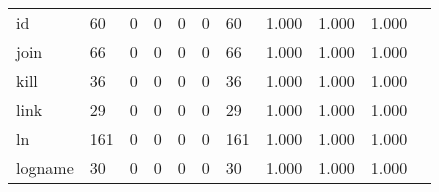 \begin{longtable}{lp{1.2cm}p{1.2cm}p{1.2cm}p{1.2cm}p{1.2cm}p{1.2cm}p{1.2cm}p{1.2cm}p{1.2cm}p{1.2cm}}
id        &                                    60 &                                                  0 &                                                  0 &                                                  0 &                                                  0 &                                                 60 &                                              1.000 &                                              1.000 &                                              1.000 \\
join      &                                    66 &                                                  0 &                                                  0 &                                                  0 &                                                  0 &                                                 66 &                                              1.000 &                                              1.000 &                                              1.000 \\
kill      &                                    36 &                                                  0 &                                                  0 &                                                  0 &                                                  0 &                                                 36 &                                              1.000 &                                              1.000 &                                              1.000 \\
link      &                                    29 &                                                  0 &                                                  0 &                                                  0 &                                                  0 &                                                 29 &                                              1.000 &                                              1.000 &                                              1.000 \\
ln        &                                   161 &                                                  0 &                                                  0 &                                                  0 &                                                  0 &                                                161 &                                              1.000 &                                              1.000 &                                              1.000 \\
logname   &                                    30 &                                                  0 &                                                  0 &                                                  0 &                                                  0 &                                                 30 &                                              1.000 &                                              1.000 &                                              1.000 \\

\end{longtable}
